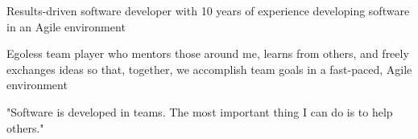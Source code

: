 %
    \begin{itemize*}
        \item Results-driven software developer with 10 years of experience developing software in an Agile environment
        \item Egoless team player who mentors those around me, learns from others, and freely exchanges ideas so that,
            together, we accomplish team goals in a fast-paced, Agile environment
        \item "Software is developed in teams.  The most important thing I can do is to help others."
    \end{itemize*}
